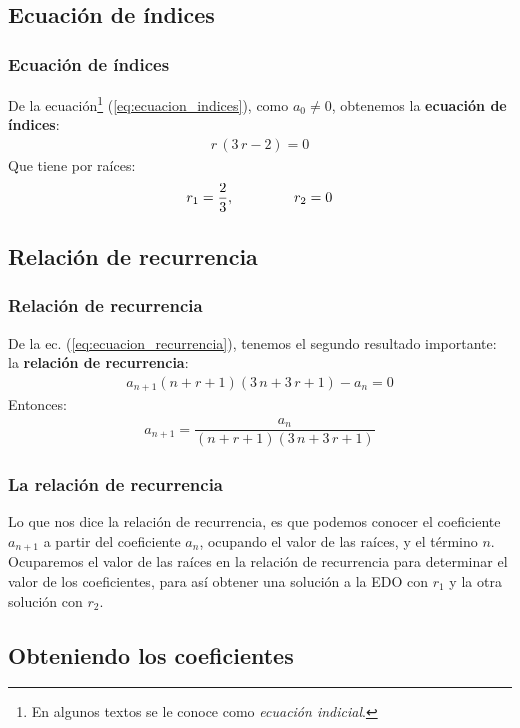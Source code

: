 \documentclass[12pt]{beamer}
\begin{document}
\subsection*{Ecuación de índices}

\begin{frame}
\frametitle{Ecuación de índices}
De la ecuación\footnote{En algunos textos se le conoce como \emph{ecuación indicial}.} (\ref{eq:ecuacion_indices}), como $a_{0} \neq 0$, obtenemos la \textbf{ecuación de índices}:
\pause
\begin{align*}
r \, (3 \, r - 2) = 0
\end{align*}
\pause
Que tiene por raíces:
\pause
\begin{align*}
r_{1} = \dfrac{2}{3}, \hspace{1.5cm} r_{2} = 0
\end{align*}
\end{frame}

\subsection*{Relación de recurrencia}

\begin{frame}
\frametitle{Relación de recurrencia}
De la ec. (\ref{eq:ecuacion_recurrencia}), tenemos el segundo resultado importante: la \textbf{relación de recurrencia}:
\begin{align*}
a_{n+1} (n + r + 1)(3 \, n + 3 \, r + 1) - a_{n} = 0
\end{align*}
\pause
Entonces:
\begin{align}
a_{n+1} = \dfrac{a_{n}}{(n + r + 1)(3 \, n + 3 \, r + 1)}
\label{eq:ecuacion_07}
\end{align}
\end{frame}
\begin{frame}
\frametitle{La relación de recurrencia}
Lo que nos dice la relación de recurrencia, es que podemos conocer el coeficiente $a_{n+1}$ a partir del coeficiente $a_{n}$, ocupando el valor de las raíces, y el término $n$.
\\
\bigskip
\pause
Ocuparemos el valor de las raíces en la relación de recurrencia para determinar el valor de los coeficientes, para así obtener una solución a la EDO con $r_{1}$ y la otra solución con $r_{2}$.
\end{frame}

\subsection*{Obteniendo los coeficientes}
\end{document}
